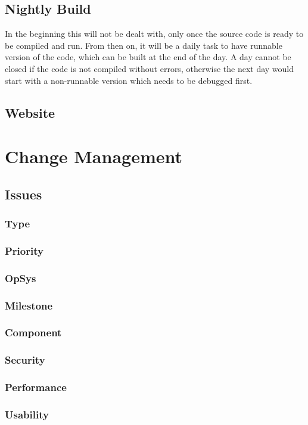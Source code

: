\documentclass{report}
\begin{document}
\section{Nightly Build}
In the beginning this will not be dealt with, only once the source code is ready to be compiled and run.
From then on, it will be a daily task to have runnable version of the code, which can be built at the end of the day.
A day cannot be closed if the code is not compiled without errors, otherwise the next day would start with a non-runnable version which needs to be debugged first.

\section{Website}

\chapter{Change Management}
\section{Issues}
\subsection{Type}
\subsection{Priority}
\subsection{OpSys}
\subsection{Milestone}
\subsection{Component}
\subsection{Security}
\subsection{Performance}
\subsection{Usability}
\end{document}
